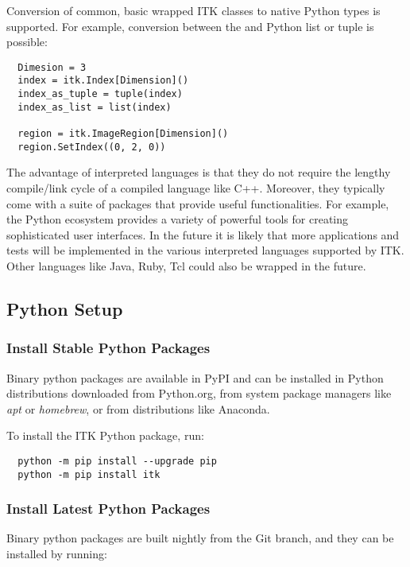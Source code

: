Conversion of common, basic wrapped ITK classes to native Python types is
supported. For example, conversion between the  and Python list
or tuple is possible:

\small
\begin{verbatim}
  Dimesion = 3
  index = itk.Index[Dimension]()
  index_as_tuple = tuple(index)
  index_as_list = list(index)

  region = itk.ImageRegion[Dimension]()
  region.SetIndex((0, 2, 0))
\end{verbatim}
\normalsize

The advantage of interpreted languages is that they do not require the lengthy
compile/link cycle of a compiled language like C++. Moreover, they typically
come with a suite of packages that provide useful functionalities. For example,
the Python ecosystem provides a variety of powerful tools for creating
sophisticated user interfaces. In the future it is likely that more
applications and tests will be implemented in the various interpreted
languages supported by ITK. Other languages like Java, Ruby, Tcl could also be
wrapped in the future.

\subsection{Python Setup}

\subsubsection{Install Stable Python Packages}

Binary python packages are available in PyPI and can be installed in Python
distributions downloaded from Python.org, from system package managers like
\textit{apt} or \textit{homebrew}, or from distributions like Anaconda.

To install the ITK Python package, run:

\small
\begin{verbatim}
  python -m pip install --upgrade pip
  python -m pip install itk
\end{verbatim}
\normalsize

\subsubsection{Install Latest Python Packages}

Binary python packages are built nightly from the Git  branch,
and they can be installed by running:

